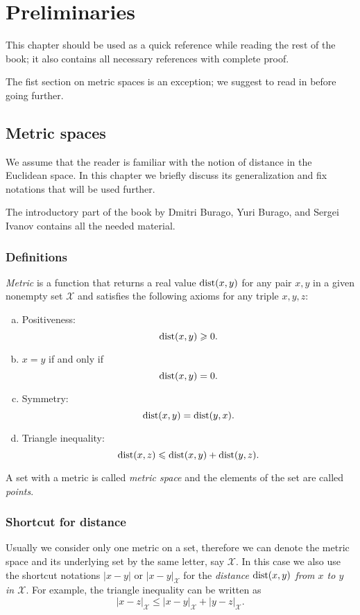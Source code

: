 \addtocounter{chapter}{-1}
\chapter{Preliminaries}

This chapter should be used as a quick reference while reading the rest of the book;
it also contains all necessary references with complete proof.

The fist section on metric spaces is an exception;
we suggest to read in before going further.

\section{Metric spaces}\label{sec:metric-spcaes}

We assume that the reader is familiar with the notion of distance in the 
Euclidean space.
In this chapter we briefly discuss its generalization and fix notations that will be used further.

The introductory part of the book by Dmitri Burago, Yuri Burago, and Sergei Ivanov \cite{burago-burago-ivanov} contains all the needed material.

\subsection*{Definitions}

\emph{Metric} is a function that returns a real value $\mathop{\rm dist}\nolimits(x,y)$ for any pair $x,y$ in a given nonempty set $\mathcal X$  and satisfies the following axioms for any triple $x,y,z$: \label{page:def:metric}
\begin{enumerate}[(a)]
\item\label{def:metric-space:a} Positiveness: 
$$\mathop{\rm dist}\nolimits(x,y)\geqslant 0.$$
\item\label{def:metric-space:b} $x=y$ if and only if 
$$\mathop{\rm dist}\nolimits(x,y)=0.$$
\item\label{def:metric-space:c} Symmetry: $$\mathop{\rm dist}\nolimits(x, y) = \mathop{\rm dist}\nolimits(y, x).$$
\item\label{def:metric-space:d} Triangle inequality: 
$$\mathop{\rm dist}\nolimits(x, z) \leqslant \mathop{\rm dist}\nolimits(x, y) + \mathop{\rm dist}\nolimits(y, z).$$
\end{enumerate}

A set with a metric is called \emph{metric space} and the elements of the set are called \emph{points}.

\subsection*{Shortcut for distance}
Usually we consider only one metric on a set, therefore we can denote the metric space and its underlying set by the same letter, say $\mathcal X$.
In this case we also use the shortcut notations $|x-y|$ or $|x-y|_{\mathcal X}$  for the {}\emph{distance $\mathop{\rm dist}\nolimits(x,y)$ from $x$ to $y$ in $\mathcal X$}.
For example, the triangle inequality can be written as 
$$|x-z|_{\mathcal X}\le |x-y|_{\mathcal X}+|y-z|_{\mathcal X}.$$


